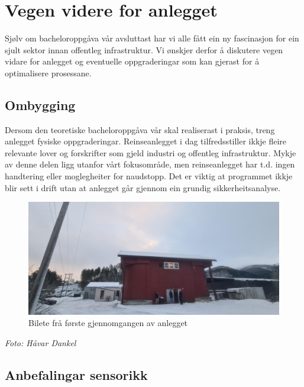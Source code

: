 \section{Vegen videre for anlegget}
\thispagestyle{fancy}

Sjølv om bacheloroppgåva vår avsluttast har vi alle fått ein ny fascinasjon for ein sjult sektor innan offentleg infrastruktur. 
Vi ønskjer derfor å diskutere vegen vidare for anlegget og eventuelle oppgraderingar som kan gjerast
for å optimalisere prosessane.


\subsection{Ombygging}

Dersom den teoretiske bacheloroppgåva vår skal realiserast i praksis, treng anlegget fysiske oppgraderingar.
Reinseanlegget i dag tilfredsstiller ikkje fleire relevante lover og forskrifter som gjeld industri og offentleg infrastruktur.
Mykje av denne delen ligg utanfor vårt fokusområde, men reinseanlegget har t.d. ingen handtering eller moglegheiter for naudstopp.
Det er viktig at programmet ikkje blir sett i drift utan at anlegget går gjennom ein grundig sikkerheitsanalyse.

\begin{figure}[htbp]
    \centering
    \includegraphics[width=1\textwidth]{Bilder/SandeGjennomgang.jpg}
    \caption{Bilete frå første gjennomgangen av anlegget}\label{fig:Bilete Gjennomgang}
\end{figure}

\begin{center}
    \textit{Foto: Håvar Dankel}
\end{center}

\newpage

\subsection{Anbefalingar sensorikk}

